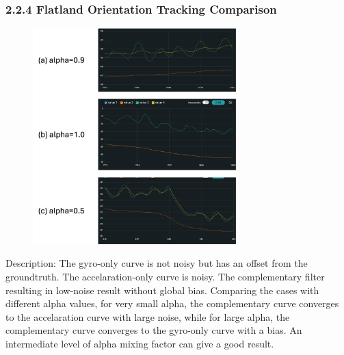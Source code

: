 \documentclass[11pt]{article}
\begin{document}
\subsubsection*{2.2.4 Flatland Orientation Tracking Comparison}
\begin{figure}[h!t]
    \centering\includegraphics[width=0.7\textwidth]{figures/fig_threecurve.png}
\end{figure}
Description: The gyro-only curve is not noisy but has an offset from the groundtruth. The accelaration-only curve is noisy. The complementary filter resulting in low-noise result without global bias. Comparing the cases with different alpha values, for very small alpha, the complementary curve converges to the accelaration curve with large noise, while for large alpha, the complementary curve converges to the gyro-only curve with a bias. An intermediate level of alpha mixing factor can give a good result. 
\end{document}
